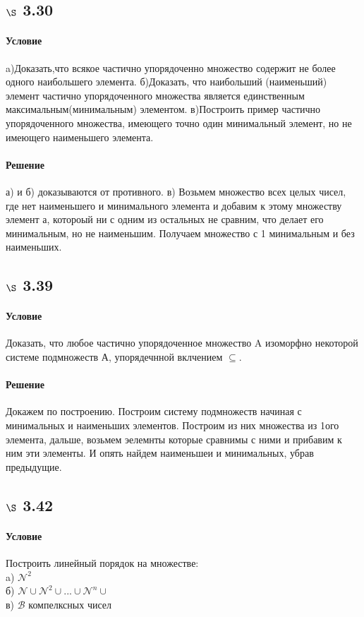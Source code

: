\documentclass[a4paper,12pt]{article}
\begin{document}
\subsection*{$\S$ 3.30}
\paragraph*{Условие}
a)Доказать,что всякое частично упорядоченно множество содержит не более одного наибольшего элемента.
б)Доказать, что наибольший (наименьший) элемент частично упорядоченного множества является единственным максимальным(минимальным) элементом.
в)Построить пример частично упорядоченного множества, имеющего точно один минимальный элемент, но не имеющего наименьшего элемента.
\paragraph*{Решение}
а) и б) доказываются от противного.
в) Возьмем множество всех целых чисел, где нет наименьшего и минимального элемента и добавим к этому множеству элемент а, котороый ни с одним из остальных не сравним, что делает его минимальным, но не наименьшим. Получаем множество с 1 минимальным и без наименьших.
\subsection*{$\S$ 3.39}
\paragraph*{Условие}
Доказать, что любое частично упорядоченное множество A изоморфно некоторой системе подмножеств А, упорядечнной вклчением $ \subseteq $.
\paragraph*{Решение}
Докажем по построению. Построим систему подмножеств начиная с минимальных и наименьших элементов. Построим из них множества из 1ого элемента, дальше, возьмем эелемнты которые сравнимы с ними и прибавим к ним эти элементы. И опять найдем наименьшеи и минимальных, убрав предыдущие.

\subsection*{$\S$ 3.42}
\paragraph*{Условие}
Построить линейный порядок на множестве:\\
a) $ \mathscr{N}^2 $\\
б) $ \mathscr{N} \cup \mathscr{N}^2 \cup ... \cup \mathscr{N}^n \cup $\\
в) $ \mathscr{B}$ компелксных чисел
\end{document}
